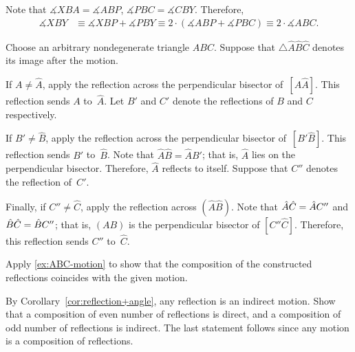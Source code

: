 Note that $\measuredangle XBA=\measuredangle ABP$, $\measuredangle PBC=\measuredangle CBY$.
Therefore,
\begin{align*}
\measuredangle XBY
&\equiv
\measuredangle XBP+\measuredangle PBY
\equiv
 2\cdot(\measuredangle ABP+\measuredangle PBC)
\equiv
 2\cdot \measuredangle ABC.
\end{align*}

\vskip-4mm

Choose an arbitrary nondegenerate triangle $ABC$.
Suppose that $\triangle \hat A \hat B\hat C$ denotes its image after the motion.

If $A\ne \hat A$, apply the reflection across the perpendicular bisector of~$[A\hat A]$.
This reflection sends $A$ to~$\hat A$.
Let $B'$ and $C'$ denote the reflections of $B$ and $C$ respectively.

If $B'\ne \hat B$, apply the reflection across the perpendicular bisector of~$[B'\hat B]$.
This reflection sends $B'$ to~$\hat B$.
Note that $\hat A\hat B=\hat AB'$;
that is, $\hat A$ lies on the perpendicular bisector. 
Therefore, $\hat A$ reflects to itself.
Suppose that $C''$ denotes the reflection of~$C'$.

Finally, if $C''\ne \hat C$, apply the reflection across $(\hat A\hat B)$.
Note that $\hat A\hat C\z=\hat AC''$ and $\hat B\hat C\z=\hat BC''$;
that is, $(AB)$ is the perpendicular bisector of $[C''\hat C]$.
Therefore, this reflection sends $C''$ to~$\hat C$.

Apply \ref{ex:ABC-motion} to show that the composition of the constructed reflections coincides with the given motion.

By Corollary~\ref{cor:reflection+angle}, any reflection is an indirect motion.
Show that a composition of even number of reflections is direct,
and a composition of odd number of reflections is indirect.
The last statement follows since any motion is a composition of reflections.

